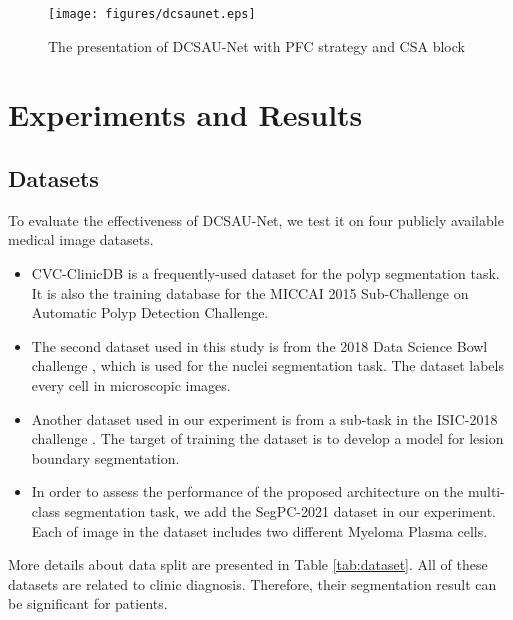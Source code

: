 \documentclass[a4paper,fleqn]{cas-dc}
\begin{document}
\begin{figure*}
  \centering
\texttt{[image: figures/dcsaunet.eps]}
  \caption{The presentation of DCSAU-Net with PFC strategy and CSA block}
  \label{fig:dcsaunet}
\end{figure*}

\section{Experiments and Results}
\label{sec:pagestyle}

\subsection{Datasets}
\label{ssec:subhead}
To evaluate the effectiveness of DCSAU-Net, we test it on four publicly available medical image datasets.
\begin{itemize}
\setlength{\itemsep}{0pt}
\setlength{\parsep}{0pt}
\setlength{\parskip}{0pt}
\item CVC-ClinicDB \cite{bernal2015wm} is a frequently-used dataset for the polyp segmentation task. It is also the training database for the MICCAI 2015 Sub-Challenge on Automatic Polyp Detection Challenge.
\item The second dataset used in this study is from the 2018 Data Science Bowl challenge \cite{caicedo2019nucleus}, which is used for the nuclei segmentation task. The dataset labels every cell in microscopic images.
\item Another dataset used in our experiment is from a sub-task in the ISIC-2018 challenge \cite{codella2018skin,tschandl2018ham10000}. The target of training the dataset is to develop a model for lesion boundary segmentation.
\item In order to assess the performance of the proposed architecture on the multi-class segmentation task, we add the SegPC-2021 dataset \cite{7np1-2q42-21} in our experiment. Each of image in the dataset includes two different Myeloma Plasma cells.
\end{itemize}
More details about data split are presented in Table \ref{tab:dataset}. All of these datasets are related to clinic diagnosis. Therefore, their segmentation result can be significant for patients.

\begin{table}[width=1\linewidth,cols=6,pos=h]
\caption{Details of the medical segmentation datasets used in our experiments.}\label{tab:dataset}
{}
\end{table}
\end{document}
